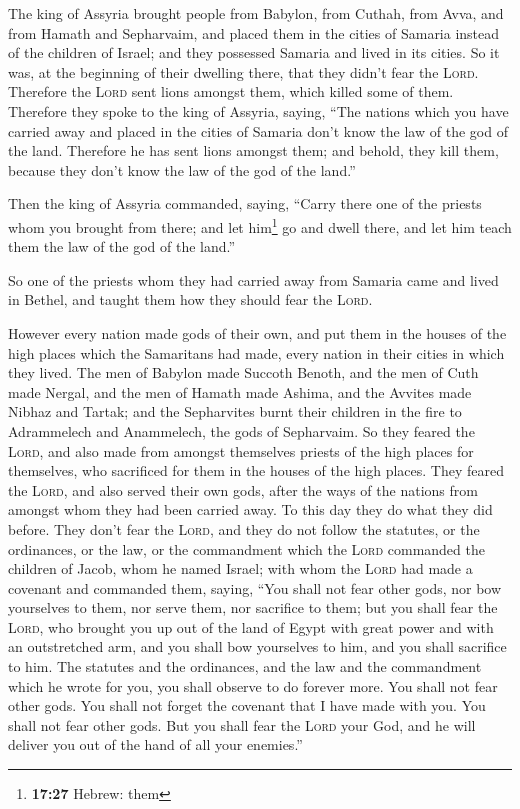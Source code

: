  The king of Assyria brought people from Babylon, from
Cuthah, from Avva, and from Hamath and Sepharvaim, and placed them in
the cities of Samaria instead of the children of Israel; and they
possessed Samaria and lived in its cities.  So it was, at
the beginning of their dwelling there, that they didn't fear the
\textsc{Lord}. Therefore the \textsc{Lord} sent lions amongst them,
which killed some of them.  Therefore they spoke to the
king of Assyria, saying, ``The nations which you have carried away and
placed in the cities of Samaria don't know the law of the god of the
land. Therefore he has sent lions amongst them; and behold, they kill
them, because they don't know the law of the god of the land.''

 Then the king of Assyria commanded, saying, ``Carry
there one of the priests whom you brought from there; and let
him\footnote{\textbf{17:27} Hebrew: them} go and dwell there, and let
him teach them the law of the god of the land.''

 So one of the priests whom they had carried away from
Samaria came and lived in Bethel, and taught them how they should fear
the \textsc{Lord}.

 However every nation made gods of their own, and put
them in the houses of the high places which the Samaritans had made,
every nation in their cities in which they lived.  The
men of Babylon made Succoth Benoth, and the men of Cuth made Nergal, and
the men of Hamath made Ashima,  and the Avvites made
Nibhaz and Tartak; and the Sepharvites burnt their children in the fire
to Adrammelech and Anammelech, the gods of Sepharvaim. 
So they feared the \textsc{Lord}, and also made from amongst themselves
priests of the high places for themselves, who sacrificed for them in
the houses of the high places.  They feared the
\textsc{Lord}, and also served their own gods, after the ways of the
nations from amongst whom they had been carried away.  To
this day they do what they did before. They don't fear the
\textsc{Lord}, and they do not follow the statutes, or the ordinances,
or the law, or the commandment which the \textsc{Lord} commanded the
children of Jacob, whom he named Israel;  with whom the
\textsc{Lord} had made a covenant and commanded them, saying, ``You
shall not fear other gods, nor bow yourselves to them, nor serve them,
nor sacrifice to them;  but you shall fear the
\textsc{Lord}, who brought you up out of the land of Egypt with great
power and with an outstretched arm, and you shall bow yourselves to him,
and you shall sacrifice to him.  The statutes and the
ordinances, and the law and the commandment which he wrote for you, you
shall observe to do forever more. You shall not fear other gods.
 You shall not forget the covenant that I have made with
you. You shall not fear other gods.  But you shall fear
the \textsc{Lord} your God, and he will deliver you out of the hand of
all your enemies.''

